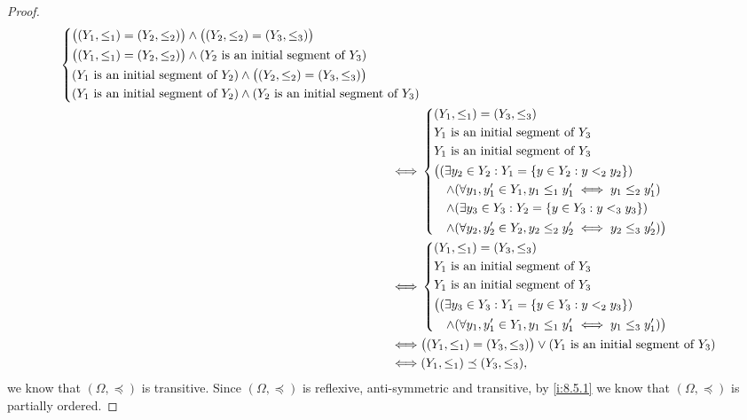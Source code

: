 \begin{proof}
\begin{align*}
\begin{dcases}
             \big((Y_1, \leq_1) = (Y_2, \leq_2)\big) \land \big((Y_2, \leq_2) = (Y_3, \leq_3)\big)     \\
             \big((Y_1, \leq_1) = (Y_2, \leq_2)\big) \land (Y_2 \text{ is an initial segment of } Y_3) \\
             (Y_1 \text{ is an initial segment of } Y_2) \land \big((Y_2, \leq_2) = (Y_3, \leq_3)\big) \\
             (Y_1 \text{ is an initial segment of } Y_2) \land (Y_2 \text{ is an initial segment of } Y_3)
           \end{dcases}                                                                      \\
    \iff & \begin{dcases}
             (Y_1, \leq_1) = (Y_3, \leq_3)                                                 \\
             Y_1 \text{ is an initial segment of } Y_3                                     \\
             Y_1 \text{ is an initial segment of } Y_3                                     \\
             \big((\exists y_2 \in Y_2 : Y_1 = \left\lbrace y \in Y_2 : y <_2 y_2\right\rbrace)                \\
             \quad \land (\forall y_1, y_1' \in Y_1, y_1 \leq_1 y_1' \iff y_1 \leq_2 y_1') \\
             \quad \land (\exists y_3 \in Y_3 : Y_2 = \left\lbrace y \in Y_3 : y <_3 y_3\right\rbrace)         \\
             \quad \land (\forall y_2, y_2' \in Y_2, y_2 \leq_2 y_2' \iff y_2 \leq_3 y_2')\big)
           \end{dcases}                                                                                 \\
    \iff & \begin{dcases}
             (Y_1, \leq_1) = (Y_3, \leq_3)                                  \\
             Y_1 \text{ is an initial segment of } Y_3                      \\
             Y_1 \text{ is an initial segment of } Y_3                      \\
             \big((\exists y_3 \in Y_3 : Y_1 = \left\lbrace y \in Y_3 : y <_2 y_3\right\rbrace) \\
             \quad \land (\forall y_1, y_1' \in Y_1, y_1 \leq_1 y_1' \iff y_1 \leq_3 y_1')\big)
           \end{dcases}                                                                                 \\
    \iff & \big((Y_1, \leq_1) = (Y_3, \leq_3)\big) \lor (Y_1 \text{ is an initial segment of } Y_3)                                                                          \\
    \iff & (Y_1, \leq_1) \preceq (Y_3, \leq_3),
  \end{align*}
  we know that \((\Omega, \preceq)\) is transitive.
  Since \((\Omega, \preceq)\) is reflexive, anti-symmetric and transitive, by \cref{i:8.5.1} we know that \((\Omega, \preceq)\) is partially ordered.


\end{proof}
